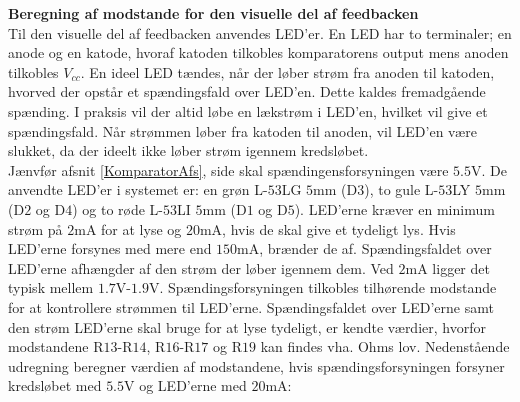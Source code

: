 \noindent\textbf{Beregning af modstande for den visuelle del af feedbacken} \\
Til den visuelle del af feedbacken anvendes LED'er. En LED har to terminaler; en anode og en katode, hvoraf katoden tilkobles komparatorens output mens anoden tilkobles $V_{cc}$. En ideel LED tændes, når der løber strøm fra anoden til katoden, hvorved der opstår et spændingsfald over LED'en. Dette kaldes fremadgående spænding. I praksis vil der altid løbe en lækstrøm i LED'en, hvilket vil give et spændingsfald. Når strømmen løber fra katoden til anoden, vil LED'en være slukket, da der ideelt ikke løber strøm igennem kredsløbet. \cite{Sedra2010} \\
Jænvfør afsnit \ref{KomparatorAfs}, side \pageref{KomparatorAfs} skal spændingensforsyningen være $5.5$V. De anvendte LED'er i systemet er: en grøn L-$53$LG $5$mm (D$3$), to gule L-$53$LY $5$mm (D$2$ og D$4$) og to røde L-$53$LI $5$mm (D$1$ og D$5$). LED'erne kræver en minimum strøm på $2$mA for at lyse og $20$mA, hvis de skal give et tydeligt lys. Hvis LED'erne forsynes med mere end $150$mA, brænder de af. Spændingsfaldet over LED'erne afhængder af den strøm der løber igennem dem. Ved $2$mA ligger det typisk mellem $1.7$V-$1.9$V. 
Spændingsforsyningen tilkobles tilhørende modstande for at kontrollere strømmen til LED'erne. \cite{kingbright} Spændingsfaldet over LED'erne samt den strøm LED'erne skal bruge for at lyse tydeligt, er kendte værdier, hvorfor modstandene R$13$-R$14$, R$16$-R$17$ og R$19$ kan findes vha. Ohms lov. Nedenstående udregning beregner værdien af modstandene, hvis spændingsforsyningen forsyner kredsløbet med $5.5$V og LED'erne med $20$mA:

